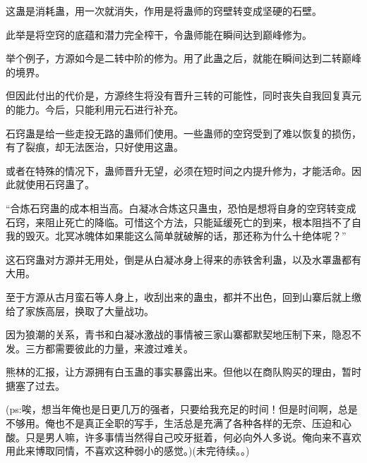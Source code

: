 \begin{this_body}
这蛊是消耗蛊，用一次就消失，作用是将蛊师的窍壁转变成坚硬的石壁。

此举是将空窍的底蕴和潜力完全榨干，令蛊师能在瞬间达到巅峰修为。

举个例子，方源如今是二转中阶的修为。用了此蛊之后，就能在瞬间达到二转巅峰的境界。

但因此付出的代价是，方源终生将没有晋升三转的可能性，同时丧失自我回复真元的能力。今后，只能利用元石进行补充。

石窍蛊是给一些走投无路的蛊师们使用。一些蛊师的空窍受到了难以恢复的损伤，有了裂痕，却无法医治，只好使用这蛊。

或者在特殊的情况下，蛊师晋升无望，必须在短时间之内提升修为，才能活命。因此就使用石窍蛊了。

“合炼石窍蛊的成本相当高。白凝冰合炼这只蛊虫，恐怕是想将自身的空窍转变成石窍，来阻止死亡的降临。可惜这个方法，只能延缓死亡的到来，根本阻挡不了自我的毁灭。北冥冰魄体如果能这么简单就破解的话，那还称为什么十绝体呢？”

这石窍蛊对方源并无用处，倒是从白凝冰身上得来的赤铁舍利蛊，以及水罩蛊都有大用。

至于方源从古月蛮石等人身上，收刮出来的蛊虫，都并不出色，回到山寨后就上缴给了家族高层，换取了大量战功。

因为狼潮的关系，青书和白凝冰激战的事情被三家山寨都默契地压制下来，隐忍不发。三方都需要彼此的力量，来渡过难关。

熊林的汇报，让方源拥有白玉蛊的事实暴露出来。但他以在商队购买的理由，暂时搪塞了过去。

(ps:唉，想当年俺也是日更几万的强者，只要给我充足的时间！但是时间啊，总是不够用。俺也不是真正全职的写手，生活总是充满了各种各样的无奈、压迫和心酸。只是男人嘛，许多事情当然得自己咬牙挺着，何必向外人多说。俺向来不喜欢用此来博取同情，不喜欢这种弱小的感觉。)(未完待续。。)

\end{this_body}


